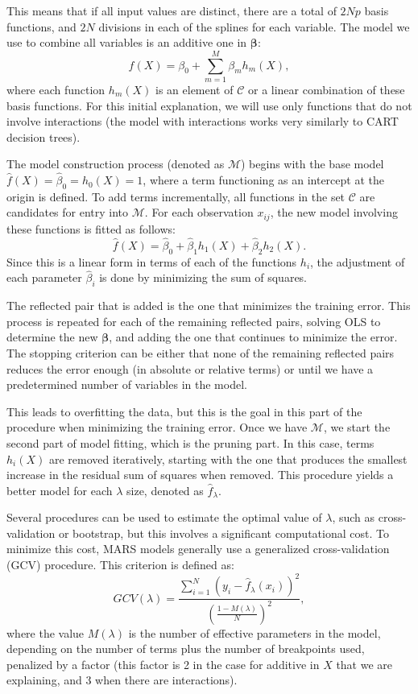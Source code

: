 This means that if all input values are distinct, there are a total of $2Np$ basis functions, and $2N$ divisions in each of the splines for each variable. The model we use to combine all variables is an additive one in $\boldsymbol\beta$:
$$
f(X) = \beta_0 + \sum_{m=1}^M \beta_m h_m(X),
$$
where each function $h_m(X)$ is an element of $\mathcal{C}$ or a linear combination of these basis functions. For this initial explanation, we will use only functions that do not involve interactions (the model with interactions works very similarly to CART decision trees).

The model construction process (denoted as $\mathcal{M}$) begins with the base model $\hat f(X) = \hat \beta_0 = h_0(X) = 1$, where a term functioning as an intercept at the origin is defined. To add terms incrementally, all functions in the set $\mathcal{C}$ are candidates for entry into $\mathcal{M}$. For each observation $x_{ij}$, the new model involving these functions is fitted as follows:
$$
\hat f(X) = \hat \beta_0 + \hat \beta_1 h_1(X) + \hat \beta_2 h_2(X).
$$
Since this is a linear form in terms of each of the functions $h_i$, the adjustment of each parameter $\hat \beta_i$ is done by minimizing the sum of squares.

The reflected pair that is added is the one that minimizes the training error. This process is repeated for each of the remaining reflected pairs, solving OLS to determine the new $\boldsymbol\beta$, and adding the one that continues to minimize the error. The stopping criterion can be either that none of the remaining reflected pairs reduces the error enough (in absolute or relative terms) or until we have a predetermined number of variables in the model.

This leads to overfitting the data, but this is the goal in this part of the procedure when minimizing the training error. Once we have $\mathcal{M}$, we start the second part of model fitting, which is the pruning part. In this case, terms $h_i(X)$ are removed iteratively, starting with the one that produces the smallest increase in the residual sum of squares when removed. This procedure yields a better model for each $\lambda$ size, denoted as $\hat f_\lambda$.

Several procedures can be used to estimate the optimal value of $\lambda$, such as cross-validation or bootstrap, but this involves a significant computational cost. To minimize this cost, MARS models generally use a generalized cross-validation (GCV) procedure. This criterion is defined as:
$$
GCV(\lambda) = \frac{ \sum_{i=1}^N (y_i - \hat f_\lambda(x_i))^2 }{\left( \frac{1 - M(\lambda)}{N} \right)^2},
$$
where the value $M(\lambda)$ is the number of effective parameters in the model, depending on the number of terms plus the number of breakpoints used, penalized by a factor (this factor is 2 in the case for additive in $X$ that we are explaining, and 3 when there are interactions).

